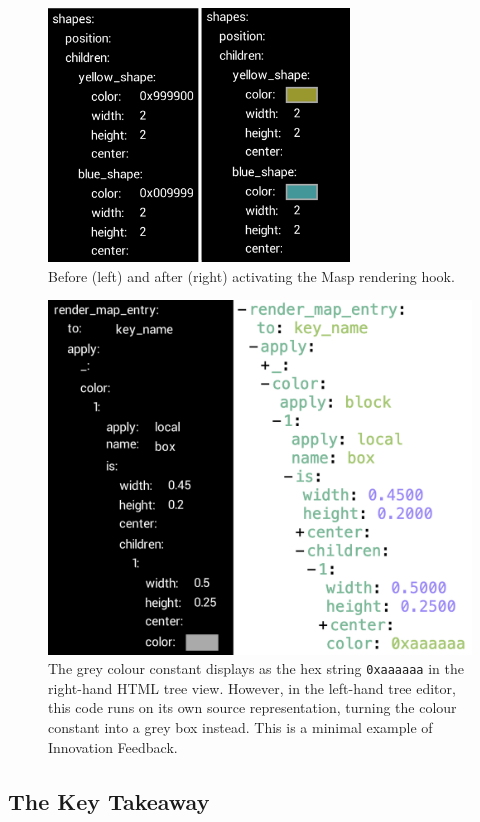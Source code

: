 \documentclass[ twoside,openright,titlepage,numbers=noenddot,headinclude,footinclude,cleardoublepage=empty,abstract=on,
                BCOR=5mm,paper=a4,fontsize=11pt
                ]{scrreprt}
\theoremstyle{definition}
\begin{document}
\begin{figure}
\centering
\includegraphics[width=8cm]{hex-strings-vs-coloured-boxes.png}
\caption[Local colour preview in BootstrapLab]{Before (left) and after (right) activating the Masp rendering hook.}
\label{fig:hex-vs-boxes}
\end{figure}

\begin{figure}
\centering
\includegraphics[width=12cm]{grey-box.png}
\caption[Innovation Feedback in BootstrapLab]{The grey colour constant displays as the hex string \texttt{0xaaaaaa} in the right-hand HTML tree view. However, in the left-hand tree editor, this code runs on its own source representation, turning the colour constant into a grey box instead. This is a minimal example of Innovation Feedback.}
\label{fig:grey-box}
\end{figure}

\hypertarget{the-key-takeaway}{\subsection{The Key Takeaway}\label{the-key-takeaway}}
\end{document}
